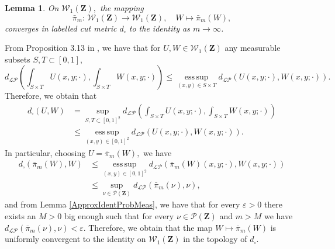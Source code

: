 \documentclass[12pt,twoside,a4paper]{article}
\newtheorem{lemma}[theorem]{Lemma}
\newcommand{\Space}{\mathbf{Z}}
\newcommand{\Graphon}{\mathcal{W}_1}
\begin{document}
\begin{lemma}\label{ApproxIdentProbGraphons}
On $\Graphon(\Space),$ the mapping 
\[
\bar{\pi}_m:\,\Graphon(\Space) \to \Graphon(\Space), \quad W \mapsto \bar{\pi}_m(W),
\]
converges in labelled cut metric $d_{\square}$ to the identity as $m \to \infty$.
\end{lemma}
\proof
From Proposition 3.13 in \cite{abraham2023probabilitygraphons}, we have that for $U,W\in \Graphon(\Space)$  any measurable subsets $S,T\subset [0,1],$
\[
d_{\mathcal{LP}}\left(\int_{S\times T}U(x,y;\cdot), \int_{S \times T}W(x,y;\cdot)\right) \leq \operatorname*{ess\,sup}_{(x,y)\in S\times T} d_{\mathcal{LP}}(U(x,y;\cdot), W(x,y;\cdot)).
\]
Therefore, we obtain that 
\begin{equation*}
\begin{aligned}
     d_{\square}(U,W)&=\sup_{S,T\subset [0,1]^2}d_{\mathcal{LP}}(\int_{S\times T}U(x,y;\cdot), \int_{S \times T}W(x,y;\cdot))
    \\& 
    \leq \operatorname*{ess\,sup}_{(x,y)\in [0,1]^2} d_{\mathcal{LP}}(U(x,y;\cdot), W(x,y;\cdot)).
\end{aligned}
\end{equation*}
In particular, choosing $U=\bar{\pi}_m(W),$ we have 
\begin{equation*}
\begin{aligned}
     d_{\square}(\bar{\pi}_m(W),W)& 
    \leq \operatorname*{ess\,sup}_{(x,y)\in [0,1]^2} d_{\mathcal{LP}}(\bar{\pi}_m(W)(x,y;\cdot), W(x,y;\cdot))\\
    & \leq \sup_{\nu\in \mathcal{P}(\Space)} d_{\mathcal{LP}}(\bar{\pi}_m(\nu), \nu),
\end{aligned}
\end{equation*}
and from Lemma \ref{ApproxIdentProbMeas}, we have that for every $\varepsilon>0$ there exists an $M>0$ big enough such that for every $\nu \in \mathcal{P}(\Space)$ and $m>M$ we have $ d_{\mathcal{LP}}(\bar{\pi}_m(\nu), \nu)<\varepsilon.$ Therefore, we obtain that the map $ W \mapsto \bar{\pi}_m(W)$ is uniformly convergent to the identity on $\Graphon(\Space)$ in the topology of $d_{\square}.$ 
\endproof
\end{document}
